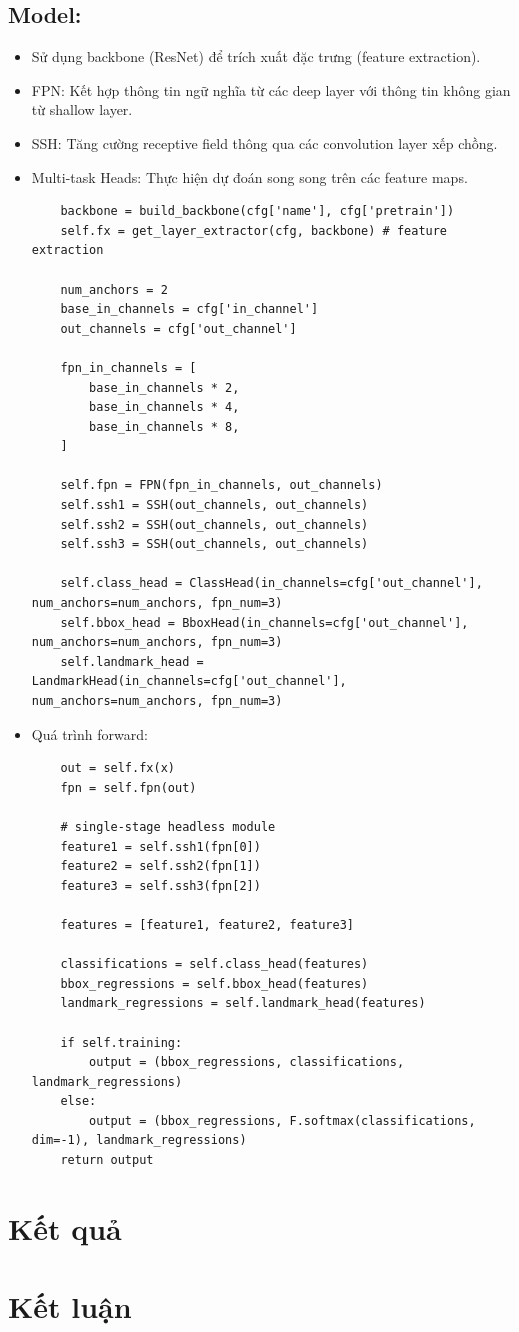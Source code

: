 \documentclass[12pt, a4paper, oneside]{book}
\theoremstyle{plain}
\numberwithin{equation}{chapter} \DeclareMathOperator{\Var}{var}
\begin{document}
\section{Model:}
\begin{itemize}
    \item[--] Sử dụng backbone (ResNet) để trích xuất đặc trưng (feature extraction).
    \item[--] FPN: Kết hợp thông tin ngữ nghĩa từ các deep layer với thông tin không gian từ shallow layer.
    \item[--] SSH: Tăng cường receptive field thông qua các convolution layer xếp chồng.
    \item[--] Multi-task Heads: Thực hiện dự đoán song song trên các feature maps.  
\begin{lstlisting}
    backbone = build_backbone(cfg['name'], cfg['pretrain'])
    self.fx = get_layer_extractor(cfg, backbone) # feature extraction

    num_anchors = 2
    base_in_channels = cfg['in_channel']
    out_channels = cfg['out_channel']

    fpn_in_channels = [
        base_in_channels * 2,
        base_in_channels * 4,
        base_in_channels * 8,
    ]

    self.fpn = FPN(fpn_in_channels, out_channels)
    self.ssh1 = SSH(out_channels, out_channels)
    self.ssh2 = SSH(out_channels, out_channels)
    self.ssh3 = SSH(out_channels, out_channels)

    self.class_head = ClassHead(in_channels=cfg['out_channel'], num_anchors=num_anchors, fpn_num=3)
    self.bbox_head = BboxHead(in_channels=cfg['out_channel'], num_anchors=num_anchors, fpn_num=3)
    self.landmark_head = LandmarkHead(in_channels=cfg['out_channel'], num_anchors=num_anchors, fpn_num=3)
\end{lstlisting}
\newpage
    \item[--] Quá trình forward:
\begin{lstlisting}
    out = self.fx(x)
    fpn = self.fpn(out)

    # single-stage headless module
    feature1 = self.ssh1(fpn[0])
    feature2 = self.ssh2(fpn[1])
    feature3 = self.ssh3(fpn[2])

    features = [feature1, feature2, feature3]

    classifications = self.class_head(features)
    bbox_regressions = self.bbox_head(features)
    landmark_regressions = self.landmark_head(features)

    if self.training:
        output = (bbox_regressions, classifications, landmark_regressions)
    else:
        output = (bbox_regressions, F.softmax(classifications, dim=-1), landmark_regressions)
    return output
\end{lstlisting}
\end{itemize}

\chapter{Kết quả}





\chapter{Kết luận}


\newpage


\end{document}
